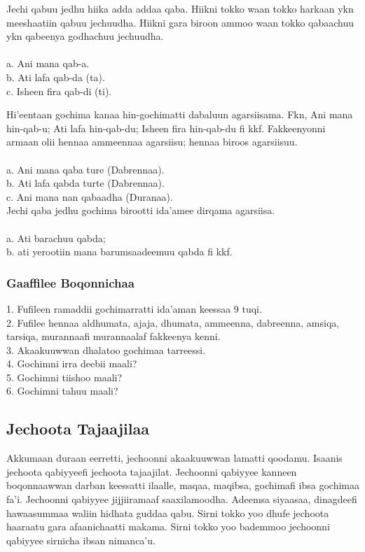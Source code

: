 \documentclass[11pt,b5paper]{book}
\begin{document}
Jechi qabuu jedhu hiika adda addaa qaba. Hiikni tokko waan tokko harkaan ykn meeshaatiin qabuu jechuudha. Hiikni gara biroon ammoo waan tokko qabaachuu ykn qabeenya godhachuu jechuudha.\\
\\
a. Ani mana qab-a.\\
b. Ati lafa qab-da (ta).\\
c. Isheen fira qab-di (ti). 

Hi’eentaan gochima kanaa hin-gochimatti dabaluun agarsiisama. Fkn, Ani mana hin-qab-u; Ati lafa hin-qab-du;
Isheen fira hin-qab-du fi kkf. Fakkeenyonni armaan olii hennaa ammeennaa agarsiisu; hennaa biroos agarsiisuu.\\
\\
a. Ani mana qaba ture (Dabrennaa).\\
b. Ati lafa qabda turte (Dabrennaa).\\
c. Ani mana nan qabaadha (Duranaa). \\

Jechi qaba jedhu gochima birootti ida’amee dirqama agarsiisa. \\
\\
a. Ati barachuu qabda; \\
b. ati yerootiin mana barumsaadeemuu qabda fi kkf.

\subsubsection{Gaaffilee Boqonnichaa }

1. Fufileen ramaddii gochimarratti ida’aman keessaa 9 tuqi.\\
2. Fufilee hennaa aldhumata, ajaja, dhumata, ammeenna, dabreenna, amsiqa, tarsiqa, murannaafi murannaalaf fakkeenya kenni.\\
3. Akaakuuwwan dhalatoo gochimaa tarreessi.\\
4. Gochimni irra deebii maali?\\
5. Gochimni tiishoo maali?\\
6. Gochimni tahuu maali?

\newpage
\subsection{Jechoota Tajaajilaa}
Akkumaan duraan eerretti, jechoonni akaakuuwwan lamatti qoodamu. Isaanis jechoota qabiyyeefi jechoota tajaajilat.
Jechoonni qabiyyee kanneen boqonnaawwan darban keessatti ilaalle, maqaa, maqibsa, gochimafi ibsa gochimaa fa’i.
Jechoonni qabiyyee jijjiiramaaf saaxilamoodha. Adeemsa siyaasaa, dinagdeefi hawaasummaa waliin hidhata guddaa
qabu. Sirni tokko yoo dhufe jechoota haaraatu gara afaanichaatti makama. Sirni tokko yoo bademmoo jechoonni
qabiyyee sirnicha ibsan nimanca’u. 
\end{document}
